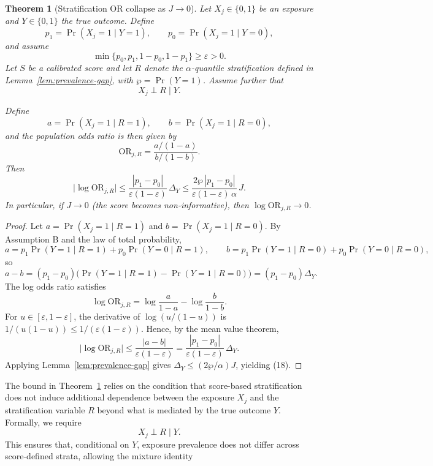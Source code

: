 \documentclass[pdflatex,sn-mathphys-num]{sn-jnl}%
\theoremstyle{thmstyleone}%
\newtheorem{theorem}{Theorem}%
\theoremstyle{thmstyletwo}%
\theoremstyle{thmstylethree}%
\begin{document}
\begin{theorem}[Stratification OR collapse as $J \to 0$]\label{thm:SPOR_collapse_J}
Let $X_j\in\{0,1\}$ be an exposure and $Y\in\{0,1\}$ the true outcome.
Define
\[
p_1 = \Pr(X_j=1 \mid Y=1), 
\qquad 
p_0 = \Pr(X_j=1 \mid Y=0),
\]
and assume
\[
\min\{p_0,p_1,1-p_0,1-p_1\} \ge \varepsilon > 0.
\]
Let $S$ be a calibrated score and let $R$ denote the $\alpha$-quantile stratification
defined in Lemma~\ref{lem:prevalence-gap}, with $\wp = \Pr(Y=1)$.
Assume further that
\[
X_j \perp R \mid Y.  \tag{Assumption B}
\]

Define
\[
a = \Pr(X_j=1 \mid R=1), 
\qquad 
b = \Pr(X_j=1 \mid R=0),
\]
and the population odds ratio is then given by
\[
\mathrm{OR}_{j,R}
=
\frac{a/(1-a)}{b/(1-b)}.
\]
Then
\[
\big|\log \mathrm{OR}_{j,R}\big|
\le
\frac{|p_1 - p_0|}{\varepsilon(1-\varepsilon)} \,\Delta_Y
\le
\frac{2\wp\,|p_1-p_0|}{\varepsilon(1-\varepsilon)\,\alpha}\,J.
\]
In particular, if $J \to 0$ (the score becomes non-informative), then
$\log \mathrm{OR}_{j,R} \to 0$.
\end{theorem}
%
\begin{proof}
Let \(a=\Pr(X_j{=}1\mid R{=}1)\) and \(b=\Pr(X_j{=}1\mid R{=}0)\). By Assumption B and the law of total probability,
\[
a=p_1\Pr(Y{=}1\mid R{=}1)+p_0\Pr(Y{=}0\mid R{=}1),\qquad
b=p_1\Pr(Y{=}1\mid R{=}0)+p_0\Pr(Y{=}0\mid R{=}0),
\]
so
\[
a-b=(p_1-p_0)\Big(\Pr(Y{=}1\mid R{=}1)-\Pr(Y{=}1\mid R{=}0)\Big)=(p_1-p_0)\Delta_Y.
\]
The log odds ratio satisfies
\[
\log\mathrm{OR}_{j,R}=\log\frac{a}{1-a}-\log\frac{b}{1-b}.
\]
For \(u\in[\varepsilon,1-\varepsilon]\), the derivative of \(\log(u/(1-u))\) is \(1/(u(1-u))\le 1/(\varepsilon(1-\varepsilon))\). Hence, by the mean value theorem,
\[
\Big|\log\mathrm{OR}_{j,R}\Big|\le \frac{|a-b|}{\varepsilon(1-\varepsilon)}=\frac{|p_1-p_0|}{\varepsilon(1-\varepsilon)}\,\Delta_Y.
\]
Applying Lemma~\ref{lem:prevalence-gap} gives \(\Delta_Y \le (2\wp/\alpha)J\), yielding (18).
\end{proof}
%
The bound in Theorem~\ref{thm:SPOR_collapse_J} relies on the condition that score-based stratification does not induce additional dependence between the exposure $X_j$ and the stratification variable $R$ beyond what is mediated by the true outcome $Y$. Formally, we require
\[
X_j \perp R \mid Y.
\]
This ensures that, conditional on $Y$, exposure prevalence does not differ across score-defined strata, allowing the mixture identity
\end{document}
